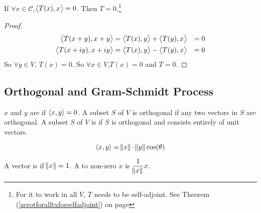 \begin{theorem}\label{zerotforalltx}
    If $\forall x \in \mathcal{C}$,$\left\langle \displaystyle T(x), x \right\rangle = 0$. Then $T = 0$.\footnote{For it to work in all $V$, $T$ needs to be self-adjoint. See Theorem (\ref{zerotforalltxforselfadjoint}) on page \pageref{zerotforalltxforselfadjoint}}
\end{theorem}
\begin{proof}
    \begin{equation*}
        \begin{aligned}
            \left\langle \displaystyle T(x+y), x+y \right\rangle &= \left\langle \displaystyle T(x), y \right\rangle + \left\langle \displaystyle T(y), x \right\rangle  &= 0 \\
            \left\langle \displaystyle T(x+iy), x+iy \right\rangle &= \left\langle \displaystyle T(x), y \right\rangle -\left\langle \displaystyle T(y), x \right\rangle &= 0            
        \end{aligned}
    \end{equation*}
    So $\forall y \in V$, $T(x) = 0$. So $\forall x \in V$,$T(x) = 0$ and $T = 0$.
\end{proof}






\subsection{Orthogonal and Gram-Schmidt Process}

\begin{definition}
	$x$ and $y$ are  if $\left\langle \displaystyle x, y \right\rangle = 0$. A subset $S$ of $V$ is orthogonal if any two vectors in $S$ are orthogonal. A subset $S$ of $V$ is  if $S$ is orthogonal and consists entirely of unit vectors.
\end{definition}

\begin{definition}
    \begin{equation}
        \left\langle \displaystyle x, y \right\rangle = \norm{x} \cdot \norm{y} \text{cos}(\theta)
    \end{equation}    
\end{definition}


\begin{definition}
	A vector is  if $\norm{x} = 1$. A  to non-zero $x$ is $\dfrac{1}{\norm{x}} x$.
\end{definition}



